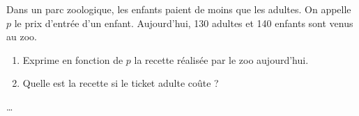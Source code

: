\begin{exercice*}
    Dans un parc zoologique, les enfants paient  de moins que les adultes. On appelle $p$ le prix d'entrée d'un enfant. Aujourd'hui, 130 adultes et 140 enfants sont venus au zoo.
    \begin{enumerate}
        \item Exprime en fonction de $p$ la recette réalisée par le zoo aujourd'hui.

        \item Quelle est la recette si le ticket adulte coûte  ?
    \end{enumerate}
\end{exercice*}
\begin{corrige}
    \dots
\end{corrige}

